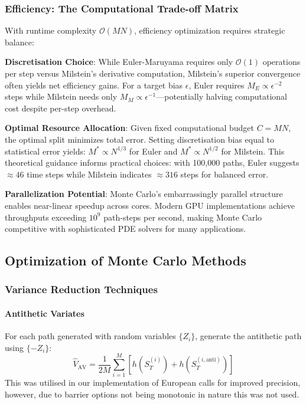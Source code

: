 \documentclass[11pt,a4paper]{article}
\begin{document}
\subsubsection{Efficiency: The Computational Trade-off Matrix}

With runtime complexity $\mathcal{O}(MN)$, efficiency optimization requires strategic balance:

\textbf{Discretisation Choice}: While Euler-Maruyama requires only $\mathcal{O}(1)$ operations per step versus Milstein's derivative computation, Milstein's superior convergence often yields net efficiency gains. For a target bias $\epsilon$, Euler requires $M_E \propto \epsilon^{-2}$ steps while Milstein needs only $M_M \propto \epsilon^{-1}$—potentially halving computational cost despite per-step overhead.

\textbf{Optimal Resource Allocation}: Given fixed computational budget $C = MN$, the optimal split minimizes total error. Setting discretisation bias equal to statistical error yields: $M^* \propto N^{1/3}$ for Euler and $M^* \propto N^{1/2}$ for Milstein. This theoretical guidance informs practical choices: with 100,000 paths, Euler suggests $\approx 46$ time steps while Milstein indicates $\approx 316$ steps for balanced error.

\textbf{Parallelization Potential}: Monte Carlo's embarrassingly parallel structure enables near-linear speedup across cores. Modern GPU implementations achieve throughputs exceeding $10^9$ path-steps per second, making Monte Carlo competitive with sophisticated PDE solvers for many applications.

\subsection{Optimization of Monte Carlo Methods}

\subsubsection{Variance Reduction Techniques}

\paragraph{Antithetic Variates}
For each path generated with random variables $\{Z_i\}$, generate the antithetic path using $\{-Z_i\}$:
\begin{equation}
\hat{V}_{\text{AV}} = \frac{1}{2M}\sum_{i=1}^M[h(S_T^{(i)}) + h(S_T^{(i,\text{anti})})]
\end{equation}
This was utilised in our implementation of European calls for improved precision, however, due to barrier options not being monotonic in nature this was not used.
\end{document}
